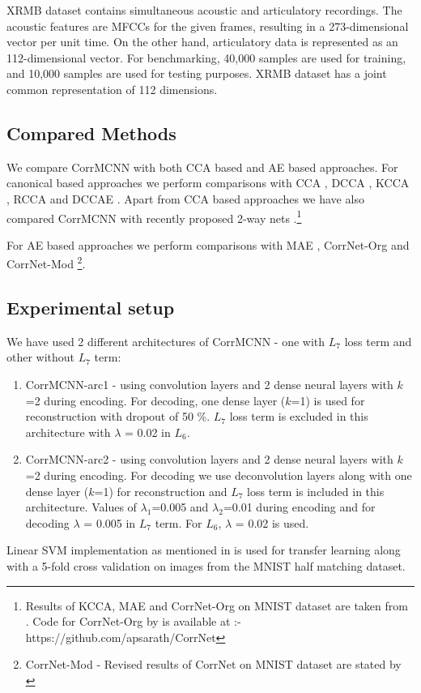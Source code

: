\documentclass[10pt, a4paper, conference, compsocconf]{IEEEtran}
\begin{document}
XRMB dataset contains simultaneous acoustic and articulatory recordings. The acoustic features are MFCCs \cite{logan2000mfcc} for the given frames, resulting in a 273-dimensional vector per unit time. On the other hand, articulatory data is represented as an 112-dimensional vector. For benchmarking, 40,000 samples are used for training, and 10,000 samples are used for testing purposes. XRMB dataset has a joint common representation of 112 dimensions.

%
\subsection{Compared Methods}
We compare CorrMCNN with both CCA based and AE based approaches. For canonical based approaches we perform comparisons with CCA \cite{hardle2007canonical}, DCCA \cite{andrew2013dcca}, KCCA \cite{akaho2006kcca}, RCCA \cite{mineiro2014rcca} and DCCAE \cite{masci2011cae}. Apart from CCA based approaches we have also compared CorrMCNN with recently proposed 2-way nets \cite{eisenschtat2016linking_2way}.\footnote{Results of KCCA, MAE and CorrNet-Org on MNIST dataset are taken from \cite{chandar2016correlational}. Code for CorrNet-Org by \cite{chandar2016correlational} is available at :- https://github.com/apsarath/CorrNet }

For AE based approaches we perform comparisons with  MAE \cite{ngiam2011multimodal}, CorrNet-Org \cite{chandar2016correlational} and CorrNet-Mod \cite{eisenschtat2016linking_2way} \footnote{CorrNet-Mod - Revised results of CorrNet on MNIST dataset are stated by \cite{eisenschtat2016linking_2way}}.

\subsection{Experimental setup}
We have used 2 different architectures of CorrMCNN - one with $L_7$ loss term and other without $L_7$ term:
\begin{enumerate}
\item CorrMCNN-arc1 - using convolution layers and 2 dense neural layers with $k$=2 during encoding. For decoding, one dense layer ($k$=1) is used for reconstruction with dropout of 50 \%. $L_7$ loss term is excluded in this architecture with $\lambda$ = 0.02 in $L_6$. 
\item CorrMCNN-arc2 - using convolution layers and 2 dense neural layers with $k$=2 during encoding. For decoding we use deconvolution layers along with one dense layer ($k$=1) for reconstruction and $L_7$ loss term is included in this architecture. Values of ${\lambda}_{1}$=0.005 and ${\lambda}_{2}$=0.01 during encoding and for decoding $\lambda$ = 0.005 in $L_7$ term. For $L_6$, $\lambda$ = 0.02 is used.
\end{enumerate}
 Linear SVM implementation as mentioned in \cite{pedregosa2011scikit} is used for transfer learning along with a 5-fold cross validation on images from the MNIST half matching dataset.
 
\end{document}
